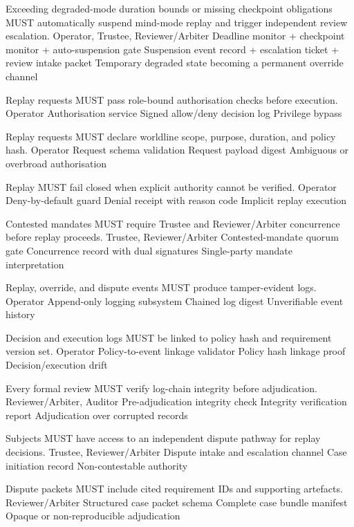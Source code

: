 \documentclass[11pt]{article}
\theoremstyle{definition}
\theoremstyle{plain}
\theoremstyle{remark}
\begin{document}
{Exceeding degraded-mode duration bounds or missing checkpoint obligations MUST automatically suspend mind-mode replay and trigger independent review escalation.}
{Operator, Trustee, Reviewer/Arbiter}
{Deadline monitor + checkpoint monitor + auto-suspension gate}
{Suspension event record + escalation ticket + review intake packet}
{Temporary degraded state becoming a permanent override channel}

{Replay requests MUST pass role-bound authorisation checks before execution.}
{Operator}
{Authorisation service}
{Signed allow/deny decision log}
{Privilege bypass}

{Replay requests MUST declare worldline scope, purpose, duration, and policy hash.}
{Operator}
{Request schema validation}
{Request payload digest}
{Ambiguous or overbroad authorisation}

{Replay MUST fail closed when explicit authority cannot be verified.}
{Operator}
{Deny-by-default guard}
{Denial receipt with reason code}
{Implicit replay execution}

{Contested mandates MUST require Trustee and Reviewer/Arbiter concurrence before replay proceeds.}
{Trustee, Reviewer/Arbiter}
{Contested-mandate quorum gate}
{Concurrence record with dual signatures}
{Single-party mandate interpretation}

{Replay, override, and dispute events MUST produce tamper-evident logs.}
{Operator}
{Append-only logging subsystem}
{Chained log digest}
{Unverifiable event history}

{Decision and execution logs MUST be linked to policy hash and requirement version set.}
{Operator}
{Policy-to-event linkage validator}
{Policy hash linkage proof}
{Decision/execution drift}

{Every formal review MUST verify log-chain integrity before adjudication.}
{Reviewer/Arbiter, Auditor}
{Pre-adjudication integrity check}
{Integrity verification report}
{Adjudication over corrupted records}

{Subjects MUST have access to an independent dispute pathway for replay decisions.}
{Trustee, Reviewer/Arbiter}
{Dispute intake and escalation channel}
{Case initiation record}
{Non-contestable authority}

{Dispute packets MUST include cited requirement IDs and supporting artefacts.}
{Reviewer/Arbiter}
{Structured case packet schema}
{Complete case bundle manifest}
{Opaque or non-reproducible adjudication}
\end{document}
